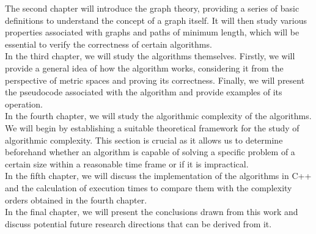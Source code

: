 The second chapter will introduce the graph theory, providing a series of basic definitions to understand the concept of a graph itself. It will then study various properties associated with graphs and paths of minimum length, which will be essential to verify the correctness of certain algorithms. \\

In the third chapter, we will study the algorithms themselves. Firstly, we will provide a general idea of how the algorithm works, considering it from the perspective of metric spaces and proving its correctness. Finally, we will present the pseudocode associated with the algorithm and provide examples of its operation. \\

In the fourth chapter, we will study the algorithmic complexity of the algorithms. We will begin by establishing a suitable theoretical framework for the study of algorithmic complexity. This section is crucial as it allows us to determine beforehand whether an algorithm is capable of solving a specific problem of a certain size within a reasonable time frame or if it is impractical. \\

In the fifth chapter, we will discuss the implementation of the algorithms in C++ and the calculation of execution times to compare them with the complexity orders obtained in the fourth chapter. \\

In the final chapter, we will present the conclusions drawn from this work and discuss potential future research directions that can be derived from it.

\endinput
